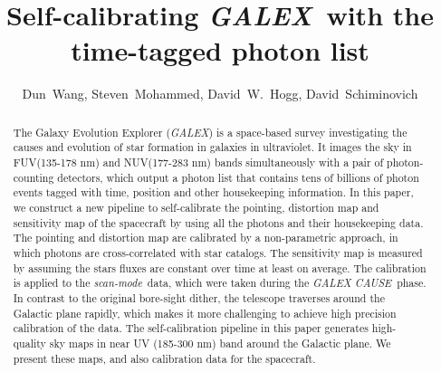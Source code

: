 \documentclass[12pt, preprint]{aastex}
\newcommand{\project}[1]{\textsl{#1}}
\newcommand{\galex}{\project{GALEX}}
\newcommand{\cause}{\project{GALEX CAUSE}}
\newcommand{\scanmode}{\project{scan-mode}}
\begin{document}
\title{Self-calibrating \galex\ with the time-tagged photon list}
\author{%
  Dun~Wang\altaffilmark{\ref{CCPP}},
  Steven~Mohammed\altaffilmark{\ref{CU}},
  David~W.~Hogg\altaffilmark{\ref{CCPP},\ref{CDS},\ref{MPIA},\ref{CCA}},
  David~Schiminovich\altaffilmark{\ref{CU}}
  }
\setcounter{address}{1}

\begin{abstract}
The Galaxy Evolution Explorer (\galex) is a space-based survey investigating the causes and evolution of star formation in galaxies in ultraviolet. 
It images the sky in FUV(135-178 nm) and NUV(177-283 nm) bands simultaneously with a pair of photon-counting detectors, which output a photon list that contains tens of billions of photon events tagged with time, position and other housekeeping information.
In this paper, we construct a new pipeline to self-calibrate the pointing,  distortion map and sensitivity map of the spacecraft by using all the photons and their housekeeping data.
The pointing and distortion map are calibrated by a non-parametric approach, in which photons are cross-correlated with star catalogs.
The sensitivity map is measured by assuming the stars fluxes are constant over time at least on average.
The calibration is applied to the \scanmode\ data, which were taken during the \cause\ phase.
In contrast to the original bore-sight dither, the telescope traverses around the Galactic plane rapidly, which makes it more challenging to achieve high precision calibration of the data. 
The self-calibration pipeline in this paper generates high-quality sky maps in near UV (185-300 nm) band around the Galactic plane.
We present these maps, and also calibration data for the spacecraft.

\end{abstract}
\end{document}
